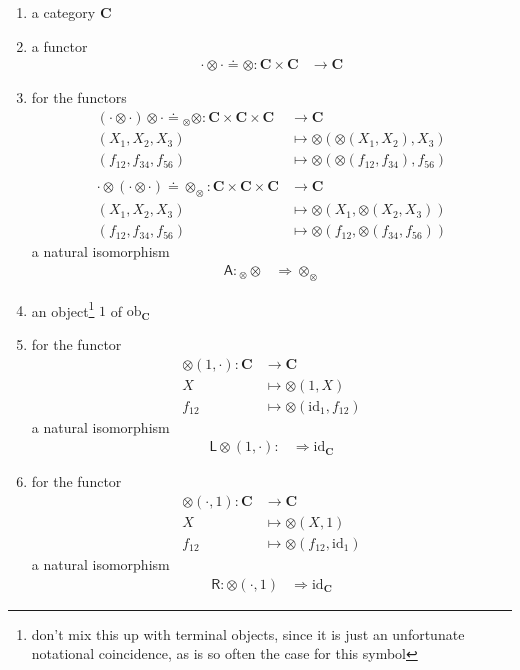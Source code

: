 \begin{enumerate}
\item[(1)]
a category $\mathbf{C}$
\item[(2)]
a functor
\begin{align*}
  \cdot
  \otimes
  \cdot
  \doteq
  \otimes
  \colon
  \mathbf{C}
  \times
  \mathbf{C}
  &\rightarrow
  \mathbf{C}
\end{align*}
\item[(3)]
for the functors
\begin{align*}
  \left(
    \cdot
    \otimes
    \cdot
  \right)
  \otimes
  \cdot
  \doteq
  {}_{\otimes}\otimes
  \colon
  \mathbf{C}
  \times
  \mathbf{C}
  \times
  \mathbf{C}
  &\rightarrow
  \mathbf{C}
  \\
  (X_{1},X_{2},X_{3})
  &\mapsto
  \otimes(\otimes(X_{1},X_{2}),X_{3})
  \\
  (f_{12},f_{34},f_{56})
  &\mapsto
  \otimes(\otimes(f_{12},f_{34}),f_{56})
  \\\\
  \cdot
  \otimes
  \left(
    \cdot
    \otimes
    \cdot
  \right)
  \doteq
  \otimes_{\otimes}
  \colon
  \mathbf{C}
  \times
  \mathbf{C}
  \times
  \mathbf{C}
  &\rightarrow
  \mathbf{C}
  \\
  (X_{1},X_{2},X_{3})
  &\mapsto
  \otimes(X_{1},\otimes(X_{2},X_{3}))
  \\
  (f_{12},f_{34},f_{56})
  &\mapsto
  \otimes(f_{12},\otimes(f_{34},f_{56}))
\end{align*}
a natural isomorphism
\begin{align*}
  \mathsf{A}
  \colon
  {}_{\otimes}\otimes
  &\Rightarrow
  \otimes_{\otimes}
\end{align*}
\item[(4)]
an object\footnote{don't mix this up with terminal objects, since it is just an unfortunate notational coincidence, as is so often the case for this symbol} $1$ of $\mathrm{ob}_{\mathbf{C}}$
\item[(5)]
for the functor
\begin{align*}
  \otimes(1,\cdot)
  \colon
  \mathbf{C}
  &\rightarrow
  \mathbf{C}
  \\
  X
  &\mapsto
  \otimes(1,X)
  \\
  f_{12}
  &\mapsto
  \otimes(\mathrm{id}_{1},f_{12})
\end{align*}
a natural isomorphism
\begin{align*}
  \mathsf{L}
  \otimes(1,\cdot)
  \colon
  &\Rightarrow
  \mathrm{id}_{\mathbf{C}}
\end{align*}
\item[(6)]
for the functor
\begin{align*}
  \otimes(\cdot,1)
  \colon
  \mathbf{C}
  &\rightarrow
  \mathbf{C}
  \\
  X
  &\mapsto
  \otimes(X,1)
  \\
  f_{12}
  &\mapsto
  \otimes(f_{12},\mathrm{id}_{1})
\end{align*}
a natural isomorphism
\begin{align*}
  \mathsf{R}
  \colon
  \otimes(\cdot,1)
  &\Rightarrow
  \mathrm{id}_{\mathbf{C}}
\end{align*}
\end{enumerate}
